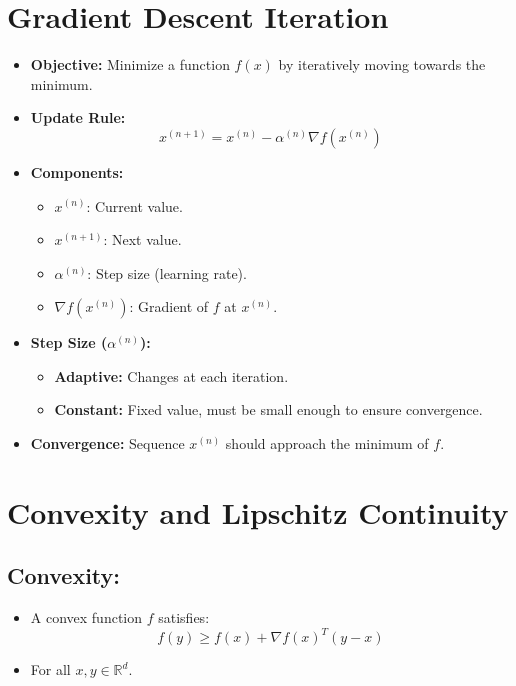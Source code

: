 \documentclass{article}
\begin{document}
\section*{Gradient Descent Iteration}

\begin{itemize}
    \item \textbf{Objective:} Minimize a function $f(x)$ by iteratively moving towards the minimum.
    
    \item \textbf{Update Rule:}
    \begin{equation*}
    x^{(n+1)} = x^{(n)} - \alpha^{(n)} \nabla f(x^{(n)})
    \end{equation*}

    \item \textbf{Components:}
    \begin{itemize}
        \item $x^{(n)}$: Current value.
        \item $x^{(n+1)}$: Next value.
        \item $\alpha^{(n)}$: Step size (learning rate).
        \item $\nabla f(x^{(n)})$: Gradient of $f$ at $x^{(n)}$.
    \end{itemize}
    
    \item \textbf{Step Size ($\alpha^{(n)}$):}
    \begin{itemize}
        \item \textbf{Adaptive:} Changes at each iteration.
        \item \textbf{Constant:} Fixed value, must be small enough to ensure convergence.
    \end{itemize}

    \item \textbf{Convergence:} Sequence $x^{(n)}$ should approach the minimum of $f$.
\end{itemize}




\section*{Convexity and Lipschitz Continuity}

\subsection*{Convexity:}
\begin{itemize}
    \item A convex function $f$ satisfies:
    \[
    f(y) \geq f(x) + \nabla f(x)^{T}(y - x)
    \]
    \item For all $x, y \in \mathbb{R}^{d}$.
\end{itemize}
\end{document}
